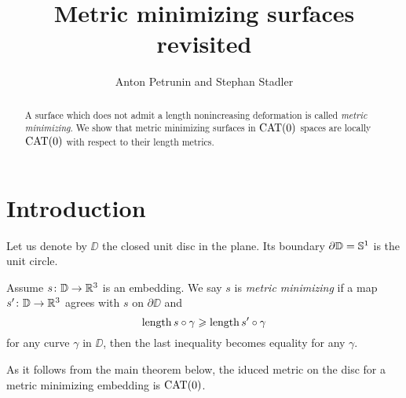 \documentclass{article}
\begin{document}
\title{Metric minimizing surfaces revisited}
\author{Anton Petrunin and Stephan Stadler}

\newcommand{\Addresses}{{\bigskip\footnotesize
Anton Petrunin, \par\nopagebreak\textsc{Department of Mathematics, PSU, University Park, PA 16802, USA}
\par\nopagebreak
\textit{Email}: \texttt{petrunin@math.psu.edu}

\medskip
 
Stephan Stadler,
\par\nopagebreak\textsc{Mathematisches Institut der Universit\"at M\"unchen, Theresienstr. 39, D-80333 M\"unchen, Germany}
\par\nopagebreak
\textit{Email}: \texttt{stadler@math.lmu.de}
}}

\date{}


\maketitle

\begin{abstract}
A surface which does not admit a length nonincreasing deformation is called \emph{metric minimizing}.
We show that metric minimizing surfaces in $\mathop{\rm CAT}\nolimits(0)$ spaces are locally $\mathop{\rm CAT}\nolimits(0)$ with respect to their length metrics. 
\end{abstract}

\section{Introduction}

Let us denote by $\DD$ the closed unit disc in the plane.
Its boundary $\partial \mathbb{D}=\mathbb{S}^1$ is the unit circle.

Assume $s\colon\mathbb{D}\to \mathbb{R}^3$ is an embedding.
We say $s$ is \emph{metric minimizing} if a map $s'\colon\mathbb{D}\to \mathbb{R}^3$ agrees with $s$ on $\partial \DD$ and 
\[\mathop{\rm length}\nolimits s\circ\gamma\geqslant \mathop{\rm length}\nolimits s'\circ\gamma\]
for any curve $\gamma$ in $\DD$, then the last inequality becomes equality for any $\gamma$.

As it follows from the main theorem below, the iduced metric on the disc for a metric minimizing embedding is $\mathop{\rm CAT}\nolimits(0)$.
\end{document}
